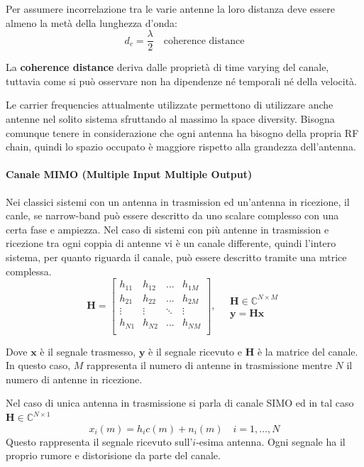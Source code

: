 Per assumere incorrelazione tra le varie antenne la loro distanza deve essere almeno la metà della lunghezza d'onda:
\[
    d_c = \frac{\lambda}{2} \quad \text{coherence distance}
\]  

La \textbf{coherence distance} deriva dalle proprietà di time varying del canale, tuttavia come si può osservare non ha dipendenze né temporali né della velocità.


Le carrier frequencies attualmente utilizzate permettono di utilizzare anche antenne nel solito sistema sfruttando al massimo la space diversity. Bisogna comunque tenere in considerazione che ogni antenna ha bisogno della propria RF chain, quindi lo spazio occupato è maggiore rispetto alla grandezza dell'antenna.


\paragraph*{Canale MIMO (Multiple Input Multiple Output)}


Nei classici sistemi con un antenna in trasmission ed un'antenna in ricezione, il canle, se narrow-band può essere descritto da uno scalare complesso con una certa fase e ampiezza.
Nel caso di sistemi con più antenne in trasmission e ricezione tra ogni coppia di antenne vi è un canale differente, quindi l'intero sistema, per quanto riguarda il canale, può essere descritto tramite una mtrice complessa.
\[ 
    \mathbf{H} = 
    \begin{bmatrix}
        h_{11} & h_{12} & \ldots & h_{1M} \\
        h_{21} & h_{22} & \ldots & h_{2M} \\
        \vdots & \vdots & \ddots & \vdots \\
        h_{N1} & h_{N2} & \ldots & h_{NM} \\
    \end{bmatrix}
    , \quad
    \begin{array}{ll}
            \mathbf{H} \in \mathbb{C}^{N \times M} \\
            \mathbf{y} = \mathbf{Hx} 
    \end{array}
\]

Dove $\mathbf{x}$ è il segnale trasmesso, $\mathbf{y}$ è il segnale ricevuto e $\mathbf{H}$ è la matrice del canale. In questo caso, $M$ rappresenta il numero di antenne in trasmissione mentre $N$ il numero di antenne in ricezione.

Nel caso di unica antenna in trasmissione si parla di canale SIMO ed in tal caso $\mathbf{H} \in \mathbb{C}^{N \times 1}$
\[
    x_i(m) = h_i c(m) + n_i(m) \quad i = 1, \ldots, N
\]
Questo rappresenta il segnale ricevuto sull'$i$-esima antenna. Ogni segnale ha il proprio rumore e distorisione da parte del canale.

